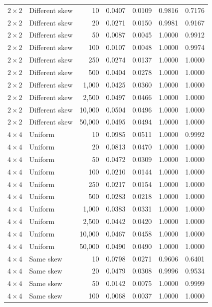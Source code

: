 \begin{longtable}{@{}llrrrrr@{}}
\(2\times2\) & Different skew & 10 & 0.0407 & 0.0109 & 0.9816 & 0.7176\\
\(2\times2\) & Different skew & 20 & 0.0271 & 0.0150 & 0.9981 & 0.9167\\
\(2\times2\) & Different skew & 50 & 0.0087 & 0.0045 & 1.0000 & 0.9912\\
\(2\times2\) & Different skew & 100 & 0.0107 & 0.0048 & 1.0000 & 0.9974\\
\(2\times2\) & Different skew & 250 & 0.0274 & 0.0137 & 1.0000 & 1.0000\\
\(2\times2\) & Different skew & 500 & 0.0404 & 0.0278 & 1.0000 & 1.0000\\
\(2\times2\) & Different skew & 1,000 & 0.0425 & 0.0360 & 1.0000 & 1.0000\\
\(2\times2\) & Different skew & 2,500 & 0.0497 & 0.0466 & 1.0000 & 1.0000\\
\(2\times2\) & Different skew & 10,000 & 0.0504 & 0.0496 & 1.0000 & 1.0000\\
\(2\times2\) & Different skew & 50,000 & 0.0495 & 0.0494 & 1.0000 & 1.0000\\
\midrule
\(4\times4\) & Uniform & 10 & 0.0985 & 0.0511 & 1.0000 & 0.9992\\
\(4\times4\) & Uniform & 20 & 0.0813 & 0.0470 & 1.0000 & 1.0000\\
\(4\times4\) & Uniform & 50 & 0.0472 & 0.0309 & 1.0000 & 1.0000\\
\(4\times4\) & Uniform & 100 & 0.0210 & 0.0144 & 1.0000 & 1.0000\\
\(4\times4\) & Uniform & 250 & 0.0217 & 0.0154 & 1.0000 & 1.0000\\
\(4\times4\) & Uniform & 500 & 0.0283 & 0.0218 & 1.0000 & 1.0000\\
\(4\times4\) & Uniform & 1,000 & 0.0383 & 0.0331 & 1.0000 & 1.0000\\
\(4\times4\) & Uniform & 2,500 & 0.0442 & 0.0420 & 1.0000 & 1.0000\\
\(4\times4\) & Uniform & 10,000 & 0.0467 & 0.0458 & 1.0000 & 1.0000\\
\(4\times4\) & Uniform & 50,000 & 0.0490 & 0.0490 & 1.0000 & 1.0000\\
\(4\times4\) & Same skew & 10 & 0.0798 & 0.0271 & 0.9606 & 0.6401\\
\(4\times4\) & Same skew & 20 & 0.0479 & 0.0308 & 0.9996 & 0.9534\\
\(4\times4\) & Same skew & 50 & 0.0142 & 0.0075 & 1.0000 & 0.9999\\
\(4\times4\) & Same skew & 100 & 0.0068 & 0.0037 & 1.0000 & 1.0000\\

\end{longtable}

